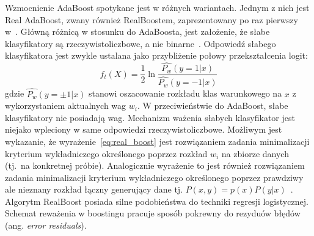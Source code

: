 Wzmocnienie AdaBoost spotykane jest w różnych wariantach.
Jednym z nich jest Real AdaBoost, zwany również RealBoostem, zaprezentowany po raz pierwszy w~\cite{10.1023/A:1007614523901}.
Główną różnicą w stosunku do AdaBoosta, jest założenie, że słabe klasyfikatory są rzeczywistoliczbowe, a nie binarne~\cite{szybka_detekcja_klesk}.
Odpowiedź słabego klasyfikatora jest zwykle ustalana jako przybliżenie połowy przekształcenia logit:
\begin{equation}
    \label{eq:real_boost}
    f_t(X) =\dfrac{1}{2}\ln\dfrac{\hat{P_w}(y=1|x)}{\hat{P_w}(y=-1|x)}
\end{equation}
gdzie $\hat{P_w}(y=\pm1|x)$ stanowi oszacowanie rozkładu klas warunkowego na $x$ z wykorzystaniem aktualnych wag $w_i$.
W przeciwieństwie do AdaBoost, słabe klasyfikatory nie posiadają wag.
Mechanizm ważenia słabych klasyfikator jest niejako wpleciony w same odpowiedzi rzeczywistoliczbowe.
Możliwym jest wykazanie, że wyrażenie~\eqref{eq:real_boost} jest rozwiązaniem zadania minimalizacji kryterium wykładniczego określonego poprzez rozkład ${w_i}$ na zbiorze danych (tj.\ na konkretnej próbie).
Analogicznie wyrażenie to jest również rozwiązaniem zadania minimalizacji kryterium wykładniczego określonego poprzez prawdziwy ale nieznany rozkład łączny generujący dane tj. $P(x,y)=p(x)P(y|x)$~\cite{szybka_detekcja_klesk}.
Algorytm RealBoost posiada silne podobieństwa do techniki regresji logistycznej.
Schemat reważenia w boostingu pracuje sposób pokrewny do rezyduów błędów (ang. \textit{error residuals}).

